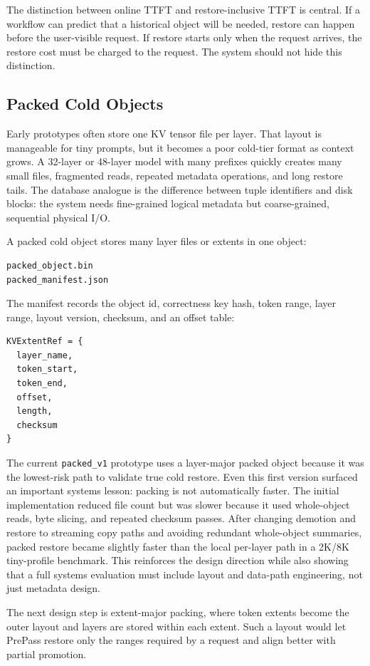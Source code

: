 \documentclass[sigconf,review,anonymous]{acmart}
\begin{document}
The distinction between online TTFT and restore-inclusive TTFT is central. If a
workflow can predict that a historical object will be needed, restore can
happen before the user-visible request. If restore starts only when the request
arrives, the restore cost must be charged to the request. The system should not
hide this distinction.

\subsection{Packed Cold Objects}

Early prototypes often store one KV tensor file per layer. That layout is
manageable for tiny prompts, but it becomes a poor cold-tier format as context
grows. A 32-layer or 48-layer model with many prefixes quickly creates many
small files, fragmented reads, repeated metadata operations, and long restore
tails. The database analogue is the difference between tuple identifiers and
disk blocks: the system needs fine-grained logical metadata but coarse-grained,
sequential physical I/O.

A packed cold object stores many layer files or extents in one object:
\begin{lstlisting}
packed_object.bin
packed_manifest.json
\end{lstlisting}

The manifest records the object id, correctness key hash, token range, layer
range, layout version, checksum, and an offset table:
\begin{lstlisting}
KVExtentRef = {
  layer_name,
  token_start,
  token_end,
  offset,
  length,
  checksum
}
\end{lstlisting}

The current \texttt{packed\_v1} prototype uses a layer-major packed object
because it was the lowest-risk path to validate true cold restore. Even this
first version surfaced an important systems lesson: packing is not
automatically faster. The initial implementation reduced file count but was
slower because it used whole-object reads, byte slicing, and repeated checksum
passes. After changing demotion and restore to streaming copy paths and
avoiding redundant whole-object summaries, packed restore became slightly
faster than the local per-layer path in a 2K/8K tiny-profile benchmark. This
reinforces the design direction while also showing that a full systems
evaluation must include layout and data-path engineering, not just metadata
design.

The next design step is extent-major packing, where token extents become the
outer layout and layers are stored within each extent. Such a layout would let
PrePass restore only the ranges required by a request and align better with
partial promotion.
\end{document}
